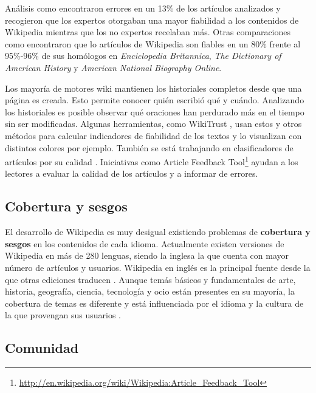 \documentclass[11pt,onecolumn]{article}
\begin{document}
Análisis como \citep{chesney2006} encontraron errores en un 13\% de los artículos analizados y recogieron que los expertos otorgaban una mayor fiabilidad a los contenidos de Wikipedia mientras que los no expertos recelaban más. Otras comparaciones como \citep{holman2008} encontraron que lo artículos de Wikipedia son fiables en un 80\% frente al 95\%-96\% de sus homólogos en \emph{Enciclopedia Britannica}, \emph{The Dictionary of American History} y \emph{American National Biography Online}.

Los mayoría de motores wiki mantienen los historiales completos desde que una página es creada. Esto permite conocer quién escribió qué y cuándo. Analizando los historiales es posible observar qué oraciones han perdurado más en el tiempo sin ser modificadas. Algunas herramientas, como WikiTrust \citep{adler2008}, usan estos y otros métodos para calcular indicadores de fiabilidad de los textos y lo visualizan con distintos colores por ejemplo. También se está trabajando en clasificadores de artículos por su calidad \citep{wu2012}. Iniciativas como Article Feedback Tool\footnote{\href{http://en.wikipedia.org/wiki/Wikipedia:Article_Feedback_Tool}{http://en.wikipedia.org/wiki/Wikipedia:Article\_Feedback\_Tool}} ayudan a los lectores a evaluar la calidad de los artículos y a informar de errores.

\subsection{Cobertura y sesgos}


El desarrollo de Wikipedia es muy desigual existiendo problemas de \textbf{cobertura y sesgos} en los contenidos de cada idioma. Actualmente existen versiones de Wikipedia en más de 280 lenguas, siendo la inglesa la que cuenta con mayor número de artículos y usuarios. Wikipedia en inglés es la principal fuente desde la que otras ediciones traducen \citep{warnckewang2012}. Aunque temás básicos y fundamentales de arte, historia, geografía, ciencia, tecnología y ocio están presentes en su mayoría, la cobertura de temas es diferente y está influenciada por el idioma y la cultura de la que provengan sus usuarios \citep{massa2012}.




\subsection{Comunidad}
\end{document}
